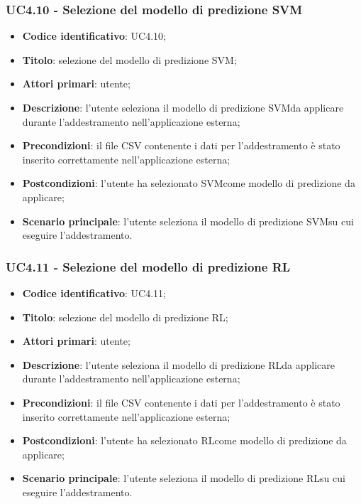 \subsubsection{UC4.10 - Selezione del modello di predizione SVM}
\begin{itemize}
	\item \textbf{Codice identificativo}: UC4.10;
	\item \textbf{Titolo}: selezione del modello di predizione SVM\glo;
	\item \textbf{Attori primari}: utente;
	\item \textbf{Descrizione}: l'utente seleziona il modello di predizione SVM\glosp da applicare durante l'addestramento nell'applicazione esterna;
	\item \textbf{Precondizioni}: il file CSV contenente i dati per l'addestramento è stato inserito correttamente nell'applicazione esterna;
	\item \textbf{Postcondizioni}: l'utente ha selezionato SVM\glosp come modello di predizione da applicare;
	\item \textbf{Scenario principale}: l'utente seleziona il modello di predizione SVM\glosp su cui eseguire l'addestramento.
\end{itemize}
\subsubsection{UC4.11 - Selezione del modello di predizione RL}
\begin{itemize}
	\item \textbf{Codice identificativo}: UC4.11;
	\item \textbf{Titolo}: selezione del modello di predizione RL\glo;
	\item \textbf{Attori primari}: utente;
	\item \textbf{Descrizione}: l'utente seleziona il modello di predizione RL\glosp da applicare durante l'addestramento nell'applicazione esterna;
	\item \textbf{Precondizioni}: il file CSV contenente i dati per l'addestramento è stato inserito correttamente nell'applicazione esterna;
	\item \textbf{Postcondizioni}: l'utente ha selezionato RL\glosp come modello di predizione da applicare;
	\item \textbf{Scenario principale}: l'utente seleziona il modello di predizione RL\glosp su cui eseguire l'addestramento.
\end{itemize}

